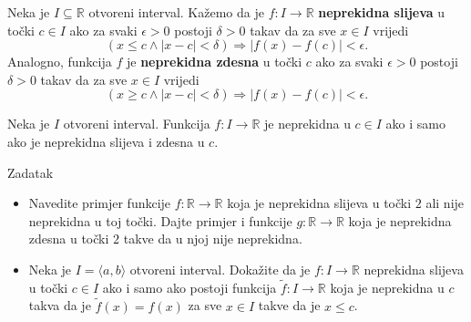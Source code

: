 \begin{definition}
Neka je $I\subseteq \mathbb{R}$ otvoreni interval. Kažemo da je $f : I \to \mathbb{R}$ \textbf{neprekidna slijeva} u točki $c\in I$ ako za svaki $\epsilon>0$ postoji $\delta>0$ takav da za sve $x\in I$ vrijedi
$$\left(x\leq c \wedge |x-c|<\delta \right)\Rightarrow \left\lvert f(x)-f(c)\right\rvert<\epsilon.$$
Analogno, funkcija $f$ je \textbf{neprekidna zdesna} u točki $c$ ako za svaki $\epsilon>0$ postoji $\delta>0$ takav da za sve $x\in I$ vrijedi
$$\left(x\geq c \wedge |x-c|<\delta \right)\Rightarrow \left\lvert f(x)-f(c)\right\rvert<\epsilon.$$
\end{definition}
\begin{remark}
Neka je $I$ otvoreni interval. Funkcija $f : I\to \mathbb{R}$ je neprekidna u $c\in I$ ako i samo ako je neprekidna slijeva i zdesna u $c$.
\end{remark}
\begin{exercise}{Zadatak} \textbf{}
\begin{itemize}
\item[a)] Navedite primjer funkcije $f : \mathbb{R}\to \mathbb{R}$ koja je neprekidna slijeva u točki $2$ ali nije neprekidna u toj točki. Dajte primjer i funkcije $g : \mathbb{R}\to \mathbb{R}$ koja je neprekidna zdesna u točki $2$ takve da u njoj nije neprekidna.
\item[b)] Neka je $I=\langle a, b\rangle$ otvoreni interval. Dokažite da je $f : I\to \mathbb{R}$ neprekidna slijeva u točki $c\in I$ ako i samo ako postoji funkcija $\tilde{f} : I\to \mathbb{R}$ koja je neprekidna u $c$ takva da je $\tilde{f}(x)=f(x)$ za sve $x\in I$ takve da je $x\leq c$.
\end{itemize}
\end{exercise}
